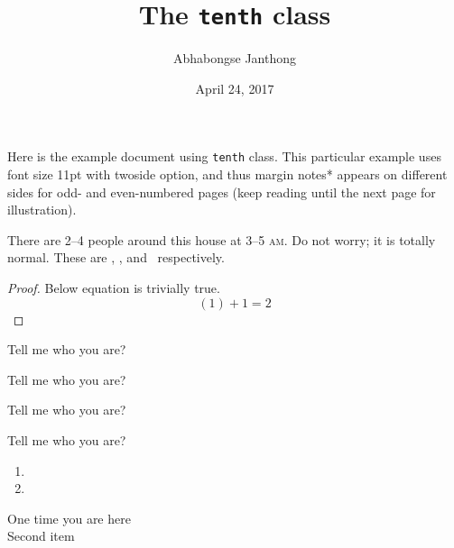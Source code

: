 \documentclass[11pt,twoside]{tenth}
\title{The \texttt{tenth} class}
\author{Abhabongse Janthong}
\date{April 24, 2017}
\begin{document}
    \maketitle

    Here is the example document using \texttt{tenth} class. This particular example uses font size 11pt with twoside option, and thus margin notes*  appears on different sides for odd- and even-numbered pages (keep reading until the next page for illustration).

    \lipsum[1-5]

    There are 2--4 people around this house at 3--5 \textsc{am}.  Do not worry; it is totally normal. These are \redsq, \greensq, and \bluesq\ respectively.

    \begin{proof}
        Below equation is trivially true.
        \begin{equation}
            (1) + 1 = 2
        \end{equation}
    \end{proof}

    \begin{question}
        Tell me who you are?
    \end{question}
    \begin{definition}
        Tell me who you are?
    \end{definition}
    \begin{theorem}
        Tell me who you are?
    \end{theorem}
    \begin{remark}
        Tell me who you are?
    \end{remark}

    \begin{enumerate}
        \item \lipsum[1-3]
        \item \lipsum[2-4]
    \end{enumerate}

    \begin{description}
        \item[One time you are here] \lipsum[1-2]
        \item[Second item] \lipsum[3-4]
    \end{description}
\end{document}
